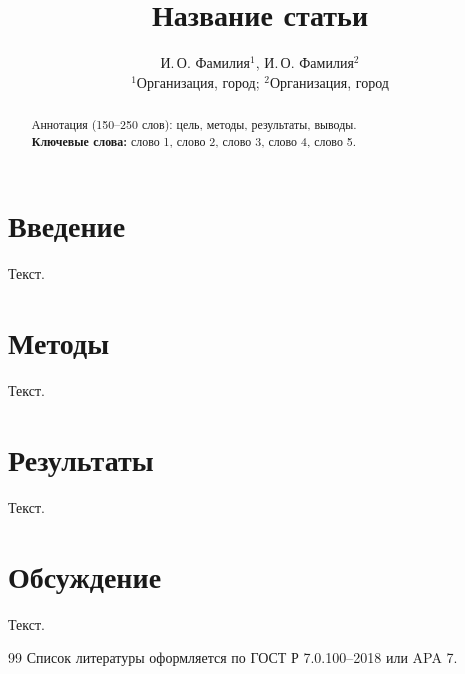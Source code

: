 \documentclass[12pt,a4paper]{article}
\title{Название статьи}
\author{И.\,О. Фамилия$^{1}$, И.\,О. Фамилия$^{2}$\\
{\small $^{1}$Организация, город; $^{2}$Организация, город}}
\date{}
\begin{document}
\maketitle

\begin{abstract}
Аннотация (150--250 слов): цель, методы, результаты, выводы.\\[6pt]
\textbf{Ключевые слова:} слово 1, слово 2, слово 3, слово 4, слово 5.
\end{abstract}

\section{Введение}
Текст.

\section{Методы}
Текст.

\section{Результаты}
Текст.

\section{Обсуждение}
Текст.

\begin{thebibliography}{99}
 Список литературы оформляется по ГОСТ Р 7.0.100--2018 или APA 7.
\end{thebibliography}
\end{document}
